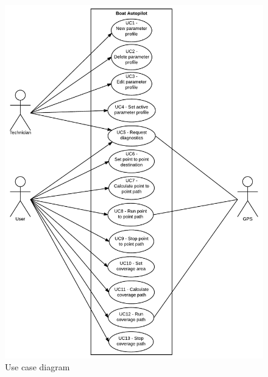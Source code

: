 \begin{figure}[H]
	\centering
	\includegraphics[width=0.9\linewidth]{Images/Requirements_specification/Usecase_diagram}
	\caption{Use case diagram}
	\label{fig:usecasediagram}
\end{figure}


